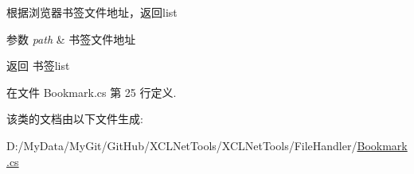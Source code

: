 根据浏览器书签文件地址，返回list 


\begin{DoxyParams}{参数}
{\em path} & 书签文件地址\\
\hline
\end{DoxyParams}
\begin{DoxyReturn}{返回}
书签list
\end{DoxyReturn}


在文件 Bookmark.\-cs 第 25 行定义.



该类的文档由以下文件生成\-:\begin{DoxyCompactItemize}
\item 
D\-:/\-My\-Data/\-My\-Git/\-Git\-Hub/\-X\-C\-L\-Net\-Tools/\-X\-C\-L\-Net\-Tools/\-File\-Handler/\hyperlink{_bookmark_8cs}{Bookmark.\-cs}\end{DoxyCompactItemize}
